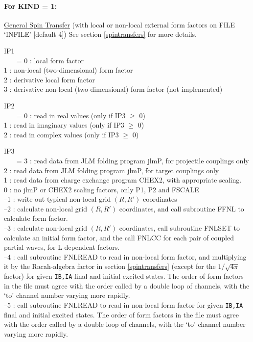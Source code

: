 \documentclass[11pt]{article}
\begin{document}
\begin{description}
\paragraph{For KIND = 1:} 
\underline{General Spin Transfer}
(with local or non-local external form factors on FILE `INFILE' [default 4])
See section \ref{spintransfers} for more details.

IP1\\
~~~  = 0 : local form factor
\\   1 : non-local (two-dimensional) form factor
\\   2 : derivative local form factor
\\   3 : derivative non-local (two-dimensional) form factor (not implemented)



IP2\\
~~~  = 0 : read in real values      (only if IP3 $\geq$ 0)
\\   1 : read in imaginary values    (only if IP3 $\geq$ 0)
\\   2 : read in complex values        (only if IP3 $\geq$ 0)



 IP3\\
~~~  = 3 : read data from JLM folding program jlmP, for projectile couplings only
\\  2 : read data from JLM folding program jlmP, for target couplings only
\\   1 : read data from charge exchange program CHEX2, with appropriate scaling.
\\   0 : no jlmP or CHEX2 scaling factors, only P1, P2 and FSCALE
\\  --1 : write out typical non-local grid $(R,R')$ coordinates
\\  --2 : calculate non-local grid $(R,R')$ coordinates,
and call subroutine FFNL to calculate form factor.
\\  --3 : calculate non-local grid $(R,R')$ coordinates,
call subroutine FNLSET to calculate an initial form factor, and the call
FNLCC for each pair of coupled partial waves, for L-dependent factors.
\\ --4 : call subroutine FNLREAD to read in non-local form factor, and multiplying it by the Racah-algebra factor
in section \ref{spintransfers} (except for the $1/\sqrt{4\pi}$ factor) for given {\tt IB,IA} final and initial excited states. 
The order of form factors in the file must agree with the order called by a double loop of channels, with the `to' channel number varying more rapidly.
\\ --5 : call subroutine FNLREAD to read in non-local form factor for given {\tt IB,IA} final and initial excited states. 
The order of form factors in the file must agree with the order called by a double loop of channels, with the `to' channel number varying more rapidly.
\\


\end{description}
\end{document}
